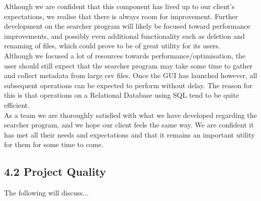 \documentclass[11pt]{article}
\begin{document}
\begin{adjustwidth}{1cm}{}
Although we are confident that this component has lived up to our client’s expectations, we realise that there is always room for improvement. Further development on the searcher program will likely be focused toward performance improvements, and possibly even additional functionality such as deletion and renaming of files, which could prove to be of great utility for its users. \\

Although we focused a lot of resources towards performance/optimisation, the user should still expect that the searcher program may take some time to gather and collect metadata from large csv files. Once the GUI has launched however, all subsequent operations can be expected to perform without delay. The reason for this is that operations on a Relational Database using SQL tend to be quite efficient. \\

As a team we are thoroughly satisfied with what we have developed regarding the searcher program, and we hope our client feels the same way. We are confident it has met all their needs and expectations and that it remains an important utility for them for some time to come.

\end{adjustwidth}

\subsection{4.2 Project Quality}
The following will discuss...
\end{document}
